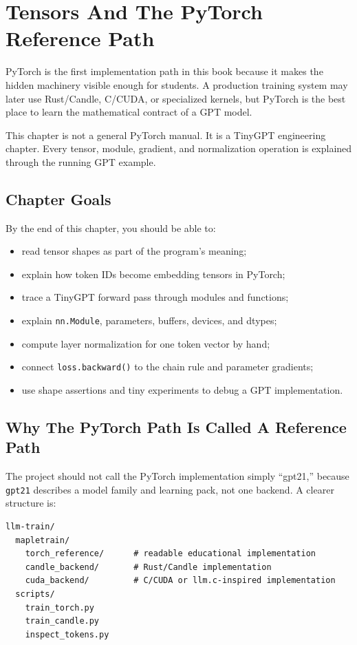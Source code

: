 \chapter{Tensors And The PyTorch Reference Path}

PyTorch is the first implementation path in this book because it makes the hidden machinery visible enough for students. A production training system may later use Rust/Candle, C/CUDA, or specialized kernels, but PyTorch is the best place to learn the mathematical contract of a GPT model.

This chapter is not a general PyTorch manual. It is a TinyGPT engineering chapter. Every tensor, module, gradient, and normalization operation is explained through the running GPT example.

\section{Chapter Goals}

By the end of this chapter, you should be able to:

\begin{itemize}
  \item read tensor shapes as part of the program's meaning;
  \item explain how token IDs become embedding tensors in PyTorch;
  \item trace a TinyGPT forward pass through modules and functions;
  \item explain \texttt{nn.Module}, parameters, buffers, devices, and dtypes;
  \item compute layer normalization for one token vector by hand;
  \item connect \texttt{loss.backward()} to the chain rule and parameter gradients;
  \item use shape assertions and tiny experiments to debug a GPT implementation.
\end{itemize}

\section{Why The PyTorch Path Is Called A Reference Path}

The project should not call the PyTorch implementation simply ``gpt21,'' because \texttt{gpt21} describes a model family and learning pack, not one backend. A clearer structure is:

\begin{lstlisting}
llm-train/
  mapletrain/
    torch_reference/      # readable educational implementation
    candle_backend/       # Rust/Candle implementation
    cuda_backend/         # C/CUDA or llm.c-inspired implementation
  scripts/
    train_torch.py
    train_candle.py
    inspect_tokens.py
\end{lstlisting}

